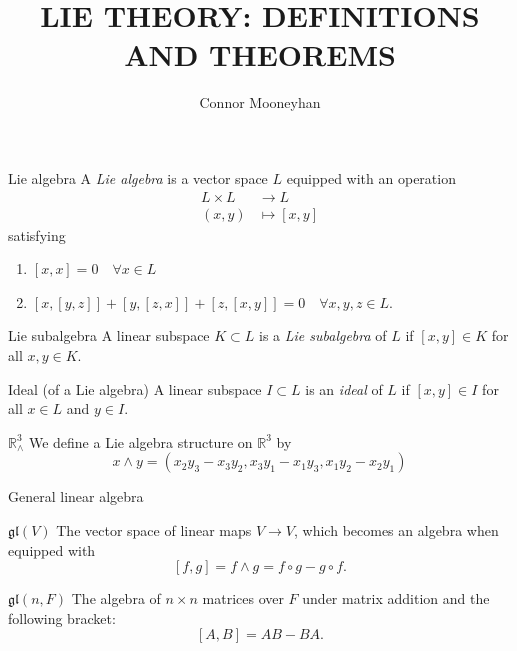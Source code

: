 \documentclass[12pt]{article}
\title{LIE THEORY: DEFINITIONS AND THEOREMS}
\author{Connor Mooneyhan}
\date{}
\newcommand{\gl}{\mathfrak{gl}}
\begin{document}
\maketitle

\begin{def-entry}{Lie algebra}
    A \textit{Lie algebra} is a vector space $L$ equipped with an operation \begin{align*}
        L \times L &\to L \\
        (x, y) & \mapsto [x, y]
    \end{align*}
    satisfying \begin{enumerate}
        \item $[x, x] = 0 \hspace{1em} \forall x \in L$
        \item $[x, [y, z]] + [y, [z, x]] + [z, [x, y]] = 0 \hspace{1em} \forall x, y, z \in L$.
    \end{enumerate}
\end{def-entry}

\begin{def-entry}{Lie subalgebra}
    A linear subspace $K \subset L$ is a \textit{Lie subalgebra} of $L$ if $[x, y] \in K$ for all $x, y \in K$.
\end{def-entry}

\begin{def-entry}{Ideal (of a Lie algebra)}
    A linear subspace $I \subset L$ is an \textit{ideal} of $L$ if $[x, y] \in I$ for all $x \in L$ and $y \in I$.
\end{def-entry}

\begin{def-entry}{$\mathbb{R}^3_\wedge$}
    We define a Lie algebra structure on $\mathbb{R}^3$ by $$x \wedge y = (x_2y_3-x_3y_2, x_3y_1 - x_1y_3, x_1y_2 - x_2y_1)$$
\end{def-entry}

\begin{def-entry}{General linear algebra}
\end{def-entry}

\begin{def-entry}[gl-v]{$\gl(V)$}
    The vector space of linear maps $V \to V$, which becomes an algebra when equipped with
    $$[f, g] = f \wedge g = f \circ g - g \circ f.$$
\end{def-entry}

\begin{def-entry}[gl-nf]{$\gl(n, F)$}
    The algebra of $n \times n$ matrices over $F$ under matrix addition and the following bracket:
    $$[A, B] = AB - BA.$$
\end{def-entry}
\end{document}
